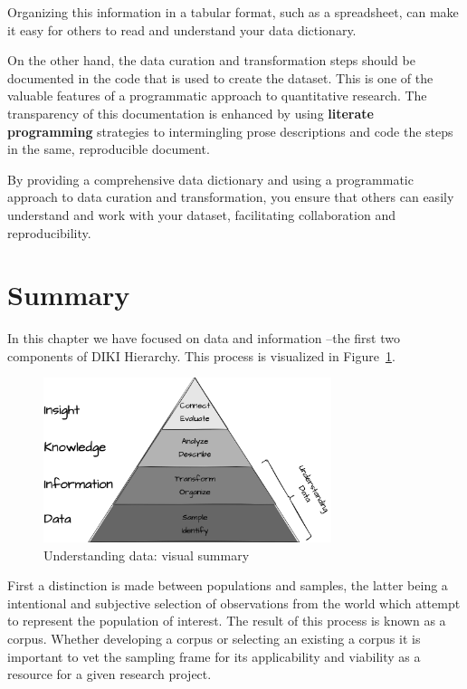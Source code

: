 \documentclass[
  letterpaper,
  DIV=11,
  numbers=noendperiod]{scrreport}
\theoremstyle{definition}
\theoremstyle{remark}
\begin{document}
Organizing this information in a tabular format, such as a spreadsheet,
can make it easy for others to read and understand your data dictionary.

On the other hand, the data curation and transformation steps should be
documented in the code that is used to create the dataset. This is one
of the valuable features of a programmatic approach to quantitative
research. The transparency of this documentation is enhanced by using
\textbf{literate programming} strategies to intermingling prose
descriptions and code the steps in the same, reproducible document.

By providing a comprehensive data dictionary and using a programmatic
approach to data curation and transformation, you ensure that others can
easily understand and work with your dataset, facilitating collaboration
and reproducibility.

\hypertarget{summary-1}{%
\section*{Summary}\label{summary-1}}


In this chapter we have focused on data and information --the first two
components of DIKI Hierarchy. This process is visualized in
Figure~\ref{fig-understanding-data-vis-sum}.

\begin{figure}[H]

{\centering \includegraphics[width=0.75\textwidth,height=\textheight]{figures/ud-diki.drawio.png}

}

\caption{\label{fig-understanding-data-vis-sum}Understanding data:
visual summary}

\end{figure}

First a distinction is made between populations and samples, the latter
being a intentional and subjective selection of observations from the
world which attempt to represent the population of interest. The result
of this process is known as a corpus. Whether developing a corpus or
selecting an existing a corpus it is important to vet the sampling frame
for its applicability and viability as a resource for a given research
project.
\end{document}

